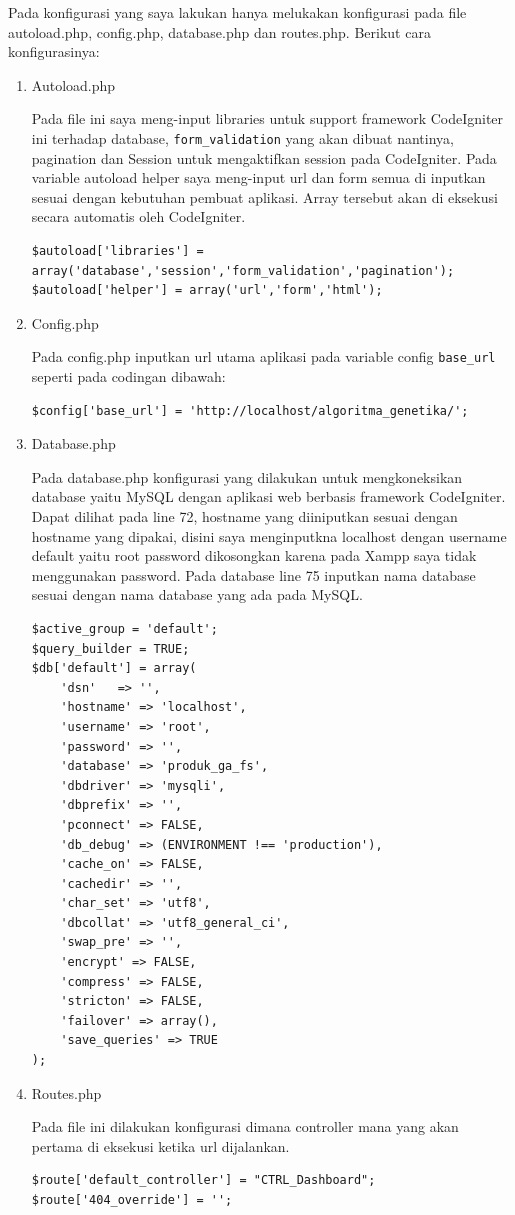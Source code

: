 Pada konfigurasi yang saya lakukan hanya melukakan konfigurasi pada file autoload.php, config.php, database.php dan routes.php. Berikut cara konfigurasinya:
\begin{enumerate}
    \item Autoload.php
		\par Pada file ini saya meng-input libraries untuk support framework CodeIgniter ini terhadap database, \verb|form_validation| yang akan dibuat nantinya, pagination dan Session untuk mengaktifkan session pada CodeIgniter. Pada variable autoload helper saya meng-input url dan form semua di inputkan sesuai dengan kebutuhan pembuat aplikasi. Array tersebut akan di eksekusi secara automatis oleh CodeIgniter.
\begin{lstlisting}
$autoload['libraries'] = array('database','session','form_validation','pagination');
$autoload['helper'] = array('url','form','html');
\end{lstlisting}

    \item Config.php
        \par Pada config.php inputkan url utama aplikasi pada variable config \verb|base_url| seperti pada codingan dibawah:
\begin{lstlisting}
$config['base_url']	= 'http://localhost/algoritma_genetika/';
\end{lstlisting}
        
    \item Database.php
		\par Pada database.php konfigurasi yang dilakukan untuk mengkoneksikan database yaitu MySQL dengan aplikasi web berbasis framework CodeIgniter. Dapat dilihat pada line 72, hostname yang diiniputkan sesuai dengan hostname yang dipakai, disini saya menginputkna localhost dengan username default yaitu root password dikosongkan karena pada Xampp saya tidak menggunakan password. Pada database line 75 inputkan nama database sesuai dengan nama database yang ada pada MySQL.
\begin{lstlisting}
$active_group = 'default';
$query_builder = TRUE;
$db['default'] = array(
	'dsn'	=> '',
	'hostname' => 'localhost',
	'username' => 'root',
	'password' => '',
	'database' => 'produk_ga_fs',
	'dbdriver' => 'mysqli',
	'dbprefix' => '',
	'pconnect' => FALSE,
	'db_debug' => (ENVIRONMENT !== 'production'),
	'cache_on' => FALSE,
	'cachedir' => '',
	'char_set' => 'utf8',
	'dbcollat' => 'utf8_general_ci',
	'swap_pre' => '',
	'encrypt' => FALSE,
	'compress' => FALSE,
	'stricton' => FALSE,
	'failover' => array(),
	'save_queries' => TRUE
);
\end{lstlisting}
		
	\item Routes.php
		\par Pada file ini dilakukan konfigurasi dimana controller mana yang akan pertama di eksekusi ketika url dijalankan.
\begin{lstlisting}
$route['default_controller'] = "CTRL_Dashboard";
$route['404_override'] = '';
\end{lstlisting}
\end{enumerate}

